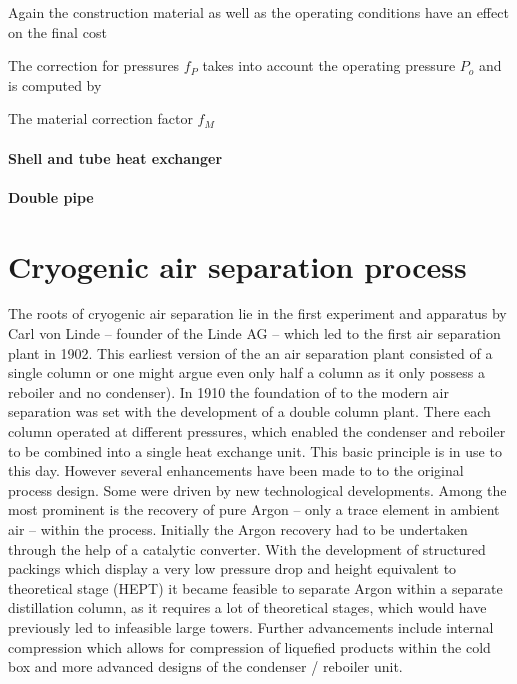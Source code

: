 		Again the construction material as well as the operating conditions have an effect on the
		final cost
		
		The correction for pressures $f_P$ takes into account the operating pressure $P_o$ and
		is computed by
		
		The material correction factor $f_M$
		
		\paragraph{Shell and tube heat exchanger}
		
		\paragraph{Double pipe}

\section{Cryogenic air separation process }	
    The roots of cryogenic air separation lie in the first experiment and apparatus by Carl von Linde -- founder of the
    Linde AG -- which led to the first air separation plant in 1902. This earliest version of the an air separation plant
    consisted of a single column or one might argue even only half a column as it only possess a reboiler and no condenser).
    In 1910 the foundation of to the modern air separation was set with the development of a double column plant. There
    each column operated at different pressures, which enabled the condenser and reboiler to be combined into a
    single heat exchange unit. This basic principle is in use to this day. However several enhancements have been made to
    to the original process design. Some were driven by new technological developments. Among the most prominent is the
    recovery of pure Argon -- only a trace element in ambient air -- within the process. Initially the Argon recovery
    had to be undertaken through the help of a catalytic converter. With the development of structured packings which
    display a very low pressure drop and height equivalent to theoretical stage (HEPT) it became feasible to separate
    Argon within a separate distillation column, as it requires a lot of theoretical stages, which would have
    previously led to infeasible large towers. Further advancements include internal compression which allows
    for compression of liquefied products within the cold box and more advanced designs of the condenser / reboiler unit.

